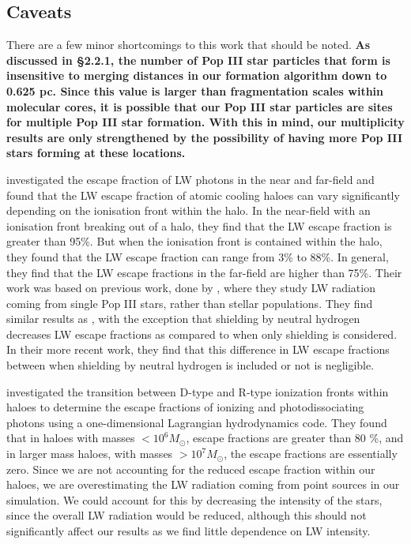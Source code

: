 \documentclass[fleqn,usenatbib]{mnras}
\begin{document}
\subsection{Caveats}

There are a few minor shortcomings to this work that should be noted. \textbf{As discussed in \S2.2.1, the number of Pop III star particles that form is insensitive to merging distances in our formation algorithm down to 0.625 pc. Since this value is larger than fragmentation scales within molecular cores, it is possible that our Pop III star particles are sites for multiple Pop III star formation. With this in mind, our multiplicity results are only strengthened by the possibility of having more Pop III stars forming at these locations.} 

\citet{Schauer17} investigated the escape fraction of LW photons in the near and far-field and found that the LW escape fraction of atomic cooling haloes can vary significantly depending on the ionisation front within the halo. In the near-field with an ionisation front breaking out of a halo, they find that the LW escape fraction is greater than 95\%. But when the ionisation front is contained within the halo, they found that the LW escape fraction can range from 3\% to 88\%. In general, they find that the LW escape fractions in the far-field are higher than 75\%. Their work was based on previous work, done by \citet{Schauer15}, where they study LW radiation coming from single Pop III stars, rather than stellar populations. They find similar results as \citet{Schauer17}, with the exception that \hh{} shielding by neutral hydrogen decreases LW escape fractions as compared to when only \hh{} shielding is considered. In their more recent work, they find that this difference in LW escape fractions between when \hh{} shielding by neutral hydrogen is included or not is negligible.

\citet{kitayama04} investigated the transition between D-type and R-type ionization fronts within haloes to determine the escape fractions of ionizing and photodissociating photons using a one-dimensional Lagrangian hydrodynamics code. They found that in haloes with masses $< 10^6 M_{\odot}$, escape fractions are greater than 80 \%, and in larger mass haloes, with masses $> 10^7 M_{\odot}$, the escape fractions are essentially zero. Since we are not accounting for the reduced escape fraction within our haloes, we are overestimating the LW radiation coming from point sources in our simulation. We could account for this by decreasing the intensity of the stars, since the overall LW radiation would be reduced, although this should not significantly affect our results as we find little dependence on LW intensity. 
\end{document}
